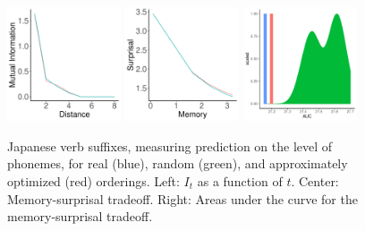 \documentclass[11pt,letterpaper]{article}
\begin{document}
\begin{figure}
\begin{center}
		\includegraphics[width=0.3\textwidth]{figures/Japanese-suffixes-byPhonemes-it-heldout.pdf}
		\includegraphics[width=0.3\textwidth]{figures/Japanese-suffixes-byPhonemes-memsurp-heldout.pdf}
		\includegraphics[width=0.3\textwidth]{figures/Japanese-suffixes-byPhonemes-auc-hist-heldout.pdf}
\end{center}
	\caption{Japanese verb suffixes, measuring prediction on the level of phonemes, for real (blue), random (green), and approximately optimized (red) orderings. Left: $I_t$ as a function of $t$. Center: Memory-surprisal tradeoff. Right: Areas under the curve for the memory-surprisal tradeoff.}\label{fig:jap-phon}
\end{figure}
\end{document}
